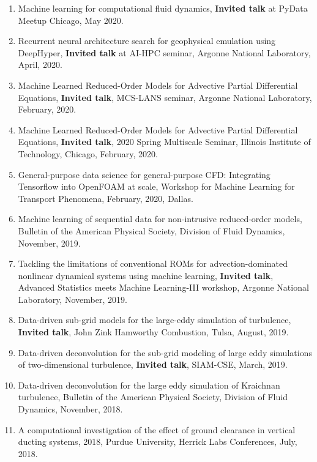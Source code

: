 \documentclass[letterpaper]{article}
\begin{document}
\begin{enumerate}
\item Machine learning for computational fluid dynamics, \textbf{Invited talk} at PyData Meetup Chicago, May 2020.

\item Recurrent neural architecture search for geophysical emulation using DeepHyper, \textbf{Invited talk} at AI-HPC seminar, Argonne National Laboratory, April, 2020.

\item Machine Learned Reduced-Order Models for Advective Partial Differential Equations, \textbf{Invited talk}, MCS-LANS seminar, Argonne National Laboratory, February, 2020.

\item Machine Learned Reduced-Order Models for Advective Partial Differential Equations, \textbf{Invited talk}, 2020 Spring Multiscale Seminar, Illinois Institute of Technology, Chicago, February, 2020.

\item General-purpose data science for general-purpose CFD: Integrating Tensorflow into OpenFOAM at scale, Workshop for Machine Learning for Transport Phenomena, February, 2020, Dallas.

\item Machine learning of sequential data for non-intrusive reduced-order models, Bulletin of the American Physical Society, Division of Fluid Dynamics, November, 2019.

\item Tackling the limitations of conventional ROMs for advection-dominated nonlinear dynamical systems using machine learning, \textbf{Invited talk}, Advanced Statistics meets Machine Learning-III workshop, Argonne National Laboratory, November, 2019.

\item Data-driven sub-grid models for the large-eddy simulation of turbulence, \textbf{Invited talk}, John Zink Hamworthy Combustion, Tulsa, August, 2019.

\item Data-driven deconvolution for the sub-grid modeling of large eddy simulations of two-dimensional turbulence, \textbf{Invited talk}, SIAM-CSE, March, 2019.

\item Data-driven deconvolution for the large eddy simulation of Kraichnan turbulence, Bulletin of the American Physical Society, Division of Fluid Dynamics, November, 2018.

\item A computational investigation of the effect of ground clearance in vertical ducting systems, 2018, Purdue University, Herrick Labs Conferences, July, 2018. 


\end{enumerate}
\end{document}
